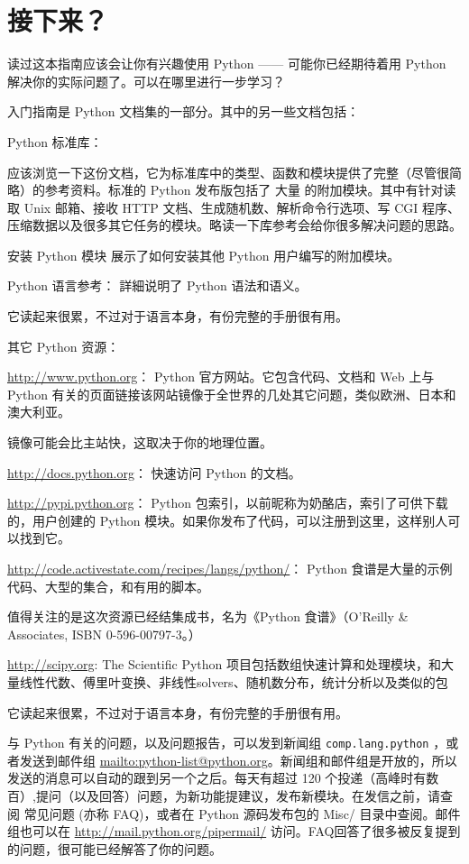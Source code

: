 \chapter{接下来？}
 读过这本指南应该会让你有兴趣使用 Python —— 可能你已经期待着用 Python 解决你的实际问题了。可以在哪里进行一步学习？

入门指南是 Python 文档集的一部分。其中的另一些文档包括：
\begin{compactitem}
    \item Python 标准库：

        应该浏览一下这份文档，它为标准库中的类型、函数和模块提供了完整（尽管很简略）的参考资料。标准的 Python 发布版包括了 大量 的附加模块。其中有针对读取 Unix 邮箱、接收 HTTP 文档、生成随机数、解析命令行选项、写 CGI 程序、压缩数据以及很多其它任务的模块。略读一下库参考会给你很多解决问题的思路。
    \item 安装 Python 模块 展示了如何安装其他 Python 用户编写的附加模块。
    \item Python 语言参考： 詳細说明了 Python 语法和语义。

它读起来很累，不过对于语言本身，有份完整的手册很有用。
\end{compactitem}
其它 Python 资源：
\begin{compactitem}
    \item \url{http://www.python.org}： Python 官方网站。它包含代码、文档和 Web 上与 Python 有关的页面链接该网站镜像于全世界的几处其它问题，类似欧洲、日本和澳大利亚。

        镜像可能会比主站快，这取决于你的地理位置。
    \item \url{http://docs.python.org}： 快速访问 Python 的文档。
    \item \url{http://pypi.python.org}： Python 包索引，以前昵称为奶酪店，索引了可供下载的，用户创建的 Python 模块。如果你发布了代码，可以注册到这里，这样别人可以找到它。
    \item \url{http://code.activestate.com/recipes/langs/python/}： Python 食谱是大量的示例代码、大型的集合，和有用的脚本。

        值得关注的是这次资源已经结集成书，名为《Python 食谱》（O’Reilly \& Associates, ISBN 0-596-00797-3。）
    \item \url{http://scipy.org}: The Scientific Python 项目包括数组快速计算和处理模块，和大量线性代数、傅里叶变换、非线性solvers、随机数分布，统计分析以及类似的包

        它读起来很累，不过对于语言本身，有份完整的手册很有用。
\end{compactitem}
与 Python 有关的问题，以及问题报告，可以发到新闻组 \texttt{comp.lang.python} ，或者发送到邮件组 \url{mailto:python-list@python.org}。新闻组和邮件组是开放的，所以发送的消息可以自动的跟到另一个之后。每天有超过 120 个投递（高峰时有数百）,提问（以及回答）问题，为新功能提建议，发布新模块。在发信之前，请查阅 常见问题 (亦称 FAQ)，或者在 Python 源码发布包的 Misc/ 目录中查阅。邮件组也可以在 \url{http://mail.python.org/pipermail/} 访问。FAQ回答了很多被反复提到的问题，很可能已经解答了你的问题。